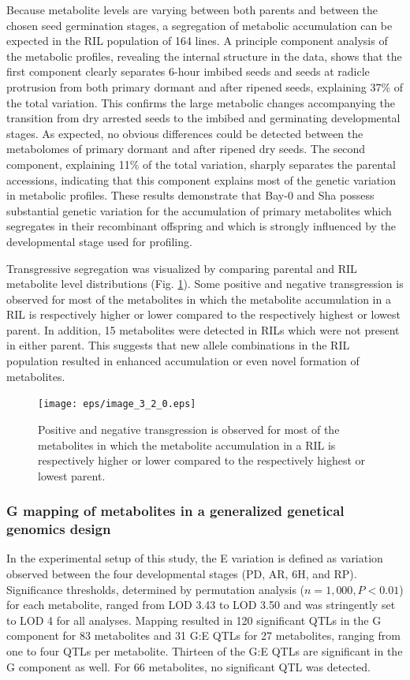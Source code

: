 Because metabolite levels are varying between both parents and between the chosen seed germination stages, a segregation of 
metabolic accumulation can be expected in the RIL population of 164 lines. A principle component analysis of the metabolic 
profiles, revealing the internal structure in the data, shows that the first component clearly separates 6-hour imbibed seeds 
and seeds at radicle protrusion from both primary dormant and after ripened seeds, explaining 37\% of the total variation. 
This confirms the large metabolic changes accompanying the transition from dry arrested seeds to the 
imbibed and germinating developmental stages. As expected, no obvious differences could be detected between the metabolomes 
of primary dormant and after ripened dry seeds. The second component, explaining 11\% of the total variation, sharply separates 
the parental accessions, indicating that this component explains most of the genetic variation in metabolic profiles. These 
results demonstrate that Bay-0 and Sha possess substantial genetic variation for the accumulation of primary metabolites which 
segregates in their recombinant offspring and which is strongly influenced by the developmental stage used for profiling.

Transgressive segregation was visualized by comparing parental and RIL metabolite level distributions (Fig. \ref{fig:transgression}). 
Some positive and negative transgression is observed for most of the metabolites in which the metabolite accumulation in a 
RIL is respectively higher or lower compared to the respectively highest or lowest parent. In addition, 15 metabolites were 
detected in RILs which were not present in either parent. This suggests that new allele combinations in the RIL population 
resulted in enhanced accumulation or even novel formation of metabolites.


\begin{figure}[h!]
  \centering
  \texttt{[image: eps/image\_3\_2\_0.eps]}
  \caption[Transgression]{Positive and negative transgression is observed for most of the metabolites in which the metabolite 
  		  accumulation in a RIL is respectively higher or lower compared to the respectively highest or lowest parent.}
    \label{fig:transgression}
\end{figure}


\subsubsection{G mapping of metabolites in a generalized genetical genomics design}
In the experimental setup of this study, the E variation is defined as variation observed between the four
developmental stages (PD, AR, 6H, and RP). Significance thresholds, determined by permutation analysis
($n = 1,000, P < 0.01$) for each metabolite, ranged from LOD 3.43 to LOD 3.50 and was stringently set to 
LOD 4 for all analyses. Mapping resulted in 120 significant QTLs in the G component for 83 metabolites and 
31 G:E QTLs for 27 metabolites, ranging from one to four QTLs per metabolite. Thirteen of the G:E QTLs are
significant in the G component as well. For 66 metabolites, no significant QTL was detected.

